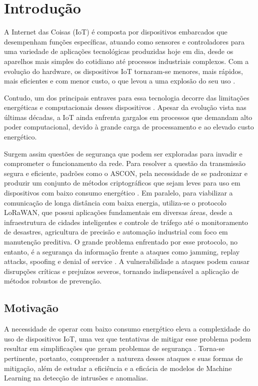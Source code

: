 \chapter{Introdução} \label{cap:introducao}

A Internet das Coisas (IoT) é composta por dispositivos embarcados que desempenham funções específicas, atuando como sensores e controladores para uma variedade de aplicações tecnológicas produzidas hoje em dia, desde os aparelhos mais simples do cotidiano até processos industriais complexos. Com a evolução do hardware, os dispositivos IoT tornaram-se menores, mais rápidos, mais eficientes e com menor custo, o que levou a uma explosão do seu uso \cite{alfuqaha2015iot}.

Contudo, um dos principais entraves para essa tecnologia decorre das limitações energéticas e computacionais desses dispositivos \cite{nistir8114}. Apesar da evolução vista nas últimas décadas, a IoT ainda enfrenta gargalos em processos que demandam alto poder computacional, devido à grande carga de processamento e ao elevado custo energético.

Surgem assim questões de segurança que podem ser exploradas para invadir e comprometer o funcionamento da rede. Para resolver a questão da transmissão segura e eficiente, padrões como o ASCON, pela necessidade de se padronizar e produzir um conjunto de métodos criptográficos que sejam leves para uso em dispositivos com baixo consumo energético \cite{nist800232}. Em paralelo, para viabilizar a comunicação de longa distância com baixa energia, utiliza-se o protocolo LoRaWAN, que possui aplicações fundamentais em diversas áreas, desde a infraestrutura de cidades inteligentes e controle de tráfego até o monitoramento de desastres, agricultura de precisão e automação industrial com foco em manutenção preditiva. O grande problema enfrentado por esse protocolo, no entanto, é a 
segurança da informação frente a ataques como jamming, replay attacks, 
spoofing e denial of service \cite{hessel2023lorawan}. A vulnerabilidade a ataques podem causar disrupções críticas e prejuízos severos, tornando indispensável a aplicação de métodos robustos de prevenção. 


\section{Motivação}
A necessidade de operar com baixo consumo energético eleva a complexidade do uso de dispositivos IoT, uma vez que tentativas de mitigar esse problema podem resultar em simplificações que geram problemas de segurança \cite{nistir8114} \cite{hessel2023lorawan}. Torna-se pertinente, portanto, compreender a natureza desses ataques e suas formas de mitigação, além de estudar a eficiência e a eficácia de modelos de Machine Learning na detecção de intrusões e anomalias.


